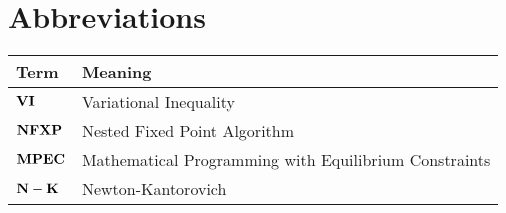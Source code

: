 

\section*{Abbreviations} %
\thispagestyle{plain} %

\phantom{This text will be invisible} 
\hspace{20cm}



\begin{table}[H]
	\centering
	\renewcommand{\arraystretch}{1.2}%
	\begin{tabular}{@{}ll@{}}
		\toprule
	Term\phantom{space}	& Meaning \\ \midrule
		$\bold{VI}$	& Variational Inequality \\
		$\bold{NFXP}$	& Nested Fixed Point Algorithm \\
		$\bold{MPEC}$	& Mathematical Programming with Equilibrium Constraints \\
		$\bold{N-K}$	& Newton-Kantorovich \\
 \bottomrule
	\end{tabular}
\end{table}